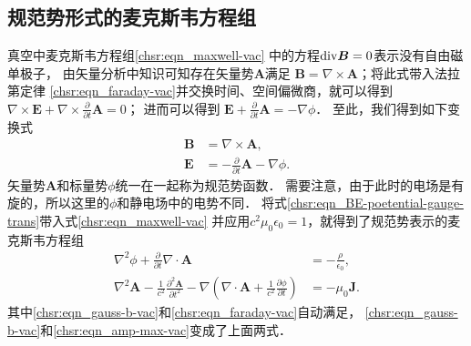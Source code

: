   

\subsection{规范势形式的麦克斯韦方程组}
真空中麦克斯韦方程组\eqref{chsr:eqn_maxwell-vac}
中的方程${\rm div} \boldsymbol{B}=0$表示没有自由磁单极子，
由矢量分析中知识可知存在矢量势$\boldsymbol{A}$满足
$\boldsymbol{B}=\nabla\times \boldsymbol{A}$；将此式带入法拉第定律
\eqref{chsr:eqn_faraday-vac}并交换时间、空间偏微商，就可以得到
$\nabla\times \boldsymbol{E} + \nabla\times \frac{\partial}{\partial t} \boldsymbol{A} = 0$；
进而可以得到
$ \boldsymbol{E} + \frac{\partial}{\partial t} \boldsymbol{A}  =- \nabla \phi$．
至此，我们得到如下变换式
\begin{subequations}\label{chsr:eqn_BE-poetential-gauge-trans}
	\begin{align}
		\boldsymbol{B} &= \nabla\times \boldsymbol{A},  \label{chsr:eqn_B-poetential-gauge-trans} \\
		\boldsymbol{E} &= -\frac{\partial}{\partial t} \boldsymbol{A}  - \nabla \phi .
		\label{chsr:eqn_E-poetential-gauge-trans}
	\end{align}
\end{subequations}
矢量势$\boldsymbol{A}$和标量势$\phi$统一在一起称为{\kaishu 规范势}函数．
需要注意，由于此时的电场是有旋的，所以这里的$\phi$和静电场中的电势不同．
将式\eqref{chsr:eqn_BE-poetential-gauge-trans}带入式\eqref{chsr:eqn_maxwell-vac}
并应用$c^2 \mu_0\epsilon_0=1$，就得到了规范势表示的麦克斯韦方程组
\begin{subequations}\label{chsr:eqn_maxwell-poetential}
	\begin{align}
		{\nabla ^2}\phi  + \frac{\partial}{\partial t} \nabla  \cdot \boldsymbol{A}
		&=  - \frac{\rho}{\epsilon _0}, \label{chsr:eqn_gauss-e-poetential} \\
		{\nabla ^2}\boldsymbol{A} - \frac{1}{c^2}\frac{\partial ^2\boldsymbol{A}}{\partial {t^2}}
		- \nabla \left( {\nabla  \cdot \boldsymbol{A} + \frac{1}{c^2}\frac{ \partial \phi }{ \partial t}} \right)
		&=  - {\mu _0}\boldsymbol{J}. \label{chsr:eqn_amp-max-poetential}
	\end{align}
\end{subequations}
其中\eqref{chsr:eqn_gauss-b-vac}和\eqref{chsr:eqn_faraday-vac}自动满足，
\eqref{chsr:eqn_gauss-b-vac}和\eqref{chsr:eqn_amp-max-vac}变成了上面两式．


